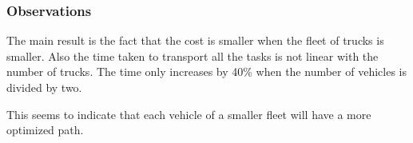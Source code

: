 \documentclass[11pt]{article}
\begin{document}
\subsubsection{Observations}

The main result is the fact that the cost is smaller when the fleet of trucks is smaller. Also the time taken to transport all the tasks is not linear with the number of trucks. The time only increases by 40\% when the number of vehicles is divided by two.

This seems to indicate that each vehicle of a smaller fleet will have a more optimized path.
\end{document}
